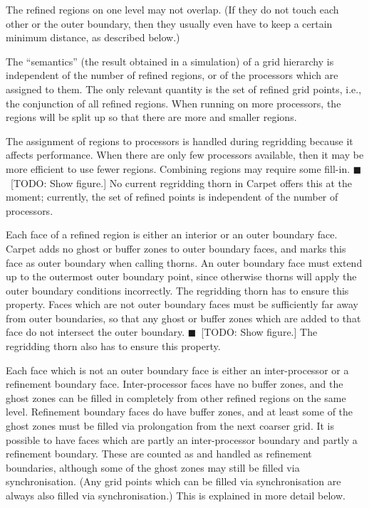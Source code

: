\documentclass[oneside]{amsart}
\newcommand{\todo}[1]{{\color{blue}$\blacksquare$~\textsf{[TODO: #1]}}}
\begin{document}
The refined regions on one level may not overlap.  (If they do not
touch each other or the outer boundary, then they usually even have to
keep a certain minimum distance, as described below.)

The ``semantics'' (the result obtained in a simulation) of a grid
hierarchy is independent of the number of refined regions, or of the
processors which are assigned to them.  The only relevant quantity is
the set of refined grid points, i.e., the conjunction of all refined
regions.  When running on more processors, the regions will be split
up so that there are more and smaller regions.

The assignment of regions to processors is handled during regridding
because it affects performance.  When there are only few processors
available, then it may be more efficient to use fewer regions.
Combining regions may require some fill-in.  \todo{Show figure.}  No
current regridding thorn in Carpet offers this at the moment;
currently, the set of refined points is independent of the number of
processors.

Each face of a refined region is either an interior or an outer
boundary face.  Carpet adds no ghost or buffer zones to outer boundary
faces, and marks this face as outer boundary when calling thorns.  An
outer boundary face must extend up to the outermost outer boundary
point, since otherwise thorns will apply the outer boundary conditions
incorrectly.  The regridding thorn has to ensure this property.  Faces
which are not outer boundary faces must be sufficiently far away from
outer boundaries, so that any ghost or buffer zones which are added to
that face do not intersect the outer boundary.  \todo{Show figure.}
The regridding thorn also has to ensure this property.

Each face which is not an outer boundary face is either an
inter-processor or a refinement boundary face.  Inter-processor faces
have no buffer zones, and the ghost zones can be filled in completely
from other refined regions on the same level.  Refinement boundary
faces do have buffer zones, and at least some of the ghost zones must
be filled via prolongation from the next coarser grid.  It is possible
to have faces which are partly an inter-processor boundary and partly
a refinement boundary.  These are counted as and handled as refinement
boundaries, although some of the ghost zones may still be filled via
synchronisation.  (Any grid points which can be filled via
synchronisation are always also filled via synchronisation.)  This is
explained in more detail below.
\end{document}
